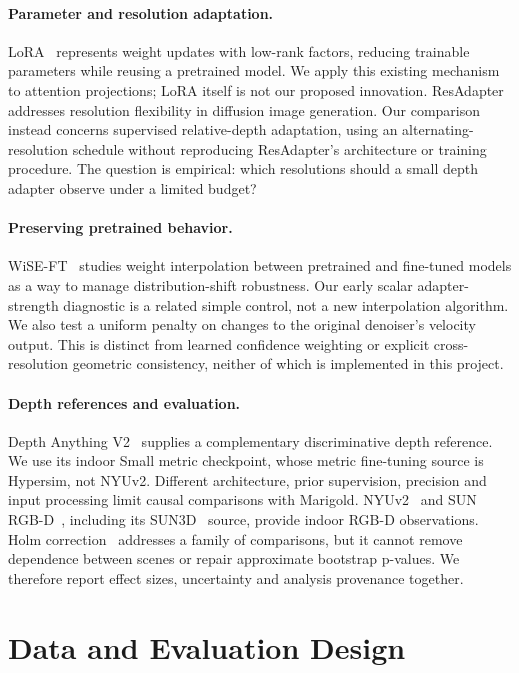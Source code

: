 \paragraph{Parameter and resolution adaptation.}
LoRA~\cite{lora} represents weight updates with low-rank factors, reducing trainable parameters while reusing a pretrained model. We apply this existing mechanism to attention projections; LoRA itself is not our proposed innovation. ResAdapter~\cite{resadapter} addresses resolution flexibility in diffusion image generation. Our comparison instead concerns supervised relative-depth adaptation, using an alternating-resolution schedule without reproducing ResAdapter's architecture or training procedure. The question is empirical: which resolutions should a small depth adapter observe under a limited budget?

\paragraph{Preserving pretrained behavior.}
WiSE-FT~\cite{wise} studies weight interpolation between pretrained and fine-tuned models as a way to manage distribution-shift robustness. Our early scalar adapter-strength diagnostic is a related simple control, not a new interpolation algorithm. We also test a uniform penalty on changes to the original denoiser's velocity output. This is distinct from learned confidence weighting or explicit cross-resolution geometric consistency, neither of which is implemented in this project.

\paragraph{Depth references and evaluation.}
Depth Anything V2~\cite{dav2} supplies a complementary discriminative depth reference. We use its indoor Small metric checkpoint, whose metric fine-tuning source is Hypersim, not NYUv2. Different architecture, prior supervision, precision and input processing limit causal comparisons with Marigold. NYUv2~\cite{nyu} and SUN RGB-D~\cite{sunrgbd}, including its SUN3D~\cite{sun3d} source, provide indoor RGB-D observations. Holm correction~\cite{holm} addresses a family of comparisons, but it cannot remove dependence between scenes or repair approximate bootstrap p-values. We therefore report effect sizes, uncertainty and analysis provenance together.

\section{Data and Evaluation Design}
